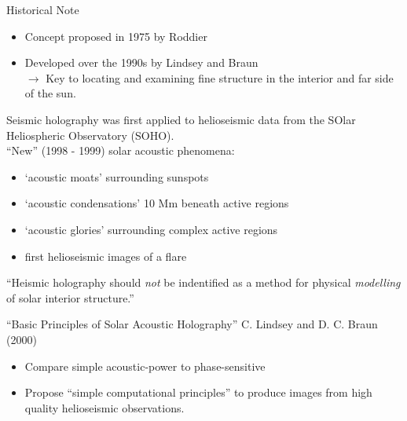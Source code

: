 \documentclass{beamer}
\begin{document}
\begin{frame}{Historical Note}
    \begin{itemize}
        \item Concept proposed in 1975 by Roddier
        \item Developed over the 1990s by Lindsey and Braun\\
            $\rightarrow$ Key to locating and examining
            fine structure in the interior and far side of the sun.
    \end{itemize}
    Seismic holography was first applied to helioseismic data from
    the SOlar Heliospheric Observatory (SOHO).\\
    ``New'' (1998 - 1999) solar acoustic phenomena:
    \begin{itemize}
        \item `acoustic moats' surrounding sunspots
        \item `acoustic condensations' 10 Mm beneath active regions
        \item `acoustic glories' surrounding complex active regions
        \item first helioseismic images of a flare
    \end{itemize}
\end{frame}
\begin{frame}
    \Large
    \textcolor{lemon}{``Heismic holography should \emph{not} be
    indentified as a method for physical \emph{modelling} of solar
    interior structure.''}
\end{frame}
\begin{frame}{``Basic Principles of Solar Acoustic Holography''}
    {C. Lindsey and D. C. Braun (2000)}
    \begin{itemize}
        \item Compare simple acoustic-power to phase-sensitive
        \item Propose ``simple computational principles'' to produce images
            from high quality helioseismic observations.
    \end{itemize}
\end{frame}
\end{document}
